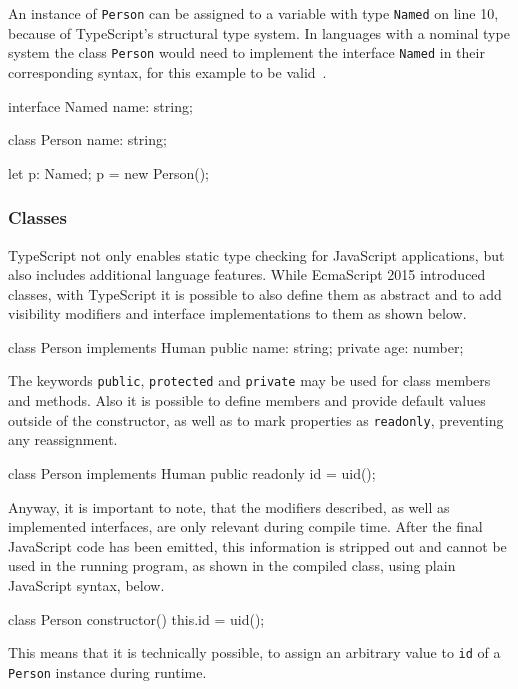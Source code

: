 \begin{program}
\caption{An instance of \texttt{Person} can be assigned to a variable with type \texttt{Named} on line 10, because of TypeScript's structural type system. In languages with a nominal type system the class \texttt{Person} would need to implement the interface \texttt{Named} in their corresponding syntax, for this example to be valid~\cite{TypeScriptHandbook:TypeCompatibility}.}
\label{prog:structural-typing}
\begin{JsCode}
interface Named {
    name: string;
}

class Person {
    name: string;
}

let p: Named;
p = new Person();
\end{JsCode}
\end{program}

\subsubsection{Classes}
\label{sec:ts-classes}

TypeScript not only enables static type checking for JavaScript applications, but also includes additional language features. While EcmaScript 2015 introduced classes, with TypeScript it is possible to also define them as abstract and to add visibility modifiers and interface implementations to them as shown below.
\begin{JsCode}[numbers=none]
class Person implements Human {
  public name: string;
  private age: number;
}
\end{JsCode}
The keywords \texttt{public}, \texttt{protected} and \texttt{private} may be used for class members and methods.
Also it is possible to define members and provide default values outside of the constructor, as well as to mark properties as \texttt{readonly}, preventing any reassignment.
\begin{JsCode}[numbers=none]
class Person implements Human {
  public readonly id = uid();
}
\end{JsCode}
Anyway, it is important to note, that the modifiers described, as well as implemented interfaces, are only relevant during compile time. After the final JavaScript code has been emitted, this information is stripped out and cannot be used in the running program, as shown in the compiled class, using plain JavaScript syntax, below.
\begin{JsCode}[numbers=none]
class Person {
  constructor() {
    this.id = uid();
  }
}
\end{JsCode}
This means that it is technically possible, to assign an arbitrary value to \texttt{id} of a \texttt{Person} instance during runtime.

